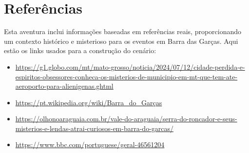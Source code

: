 \chapter{Referências}

Esta aventura inclui informações baseadas em referências reais, proporcionando um contexto histórico e misterioso para os eventos em Barra das Garças. Aqui estão os links usados para a construção do cenário:

\begin{itemize}
    \item \url{https://g1.globo.com/mt/mato-grosso/noticia/2024/07/12/cidade-perdida-e-espiritos-obsessores-conheca-os-misterios-de-municipio-em-mt-que-tem-ate-aeroporto-para-alienigenas.ghtml}
    \item \url{https://pt.wikipedia.org/wiki/Barra_do_Garças}
    \item \url{https://olhonoaraguaia.com.br/vale-do-araguaia/serra-do-roncador-e-seus-misterios-e-lendas-atrai-curiosos-em-barra-do-garcas/}
    \item \url{https://www.bbc.com/portuguese/geral-46561204}
\end{itemize}


